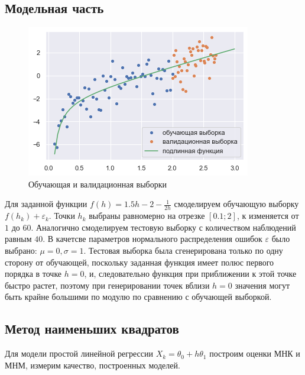 \documentclass[a4paper,12pt]{article}
\begin{document}
\subsection{Модельная часть}

\begin{figure} 
    \vspace{-4ex}
    \includegraphics[width=\linewidth]{src/img/сгенерированная_выборка.png}
    \caption{Обучающая и валидационная выборки}
\end{figure}

Для заданной функции $f(h) = 1.5h - 2 - \frac{1}{2h}$ смоделируем обучающую выборку $f(h_k) + \varepsilon_k$. Точки $h_k$ выбраны равномерно на отрезке $[0.1;2]$, $к$ изменяется от $1$ до $60$. Аналогично смоделируем тестовую выборку с количеством наблюдений равным $40$. В качетсве параметров нормального распределения ошибок $\varepsilon$ было выбрано: $\mu=0, \sigma = 1$. Тестовая выборка была сгенерирована только по одну сторону от обучающей, поскольку заданная функция имеет полюс первого порядка в точке $h = 0$, и, следовательно функция при приближении к этой точке быстро растет, поэтому при генерировании точек вблизи $h=0$ значения могут быть крайне большими по модулю по сравнению с обучающей выборкой.
\newpage

\subsection{Метод наименьших квадратов}

Для модели простой линейной регрессии $X_k = \theta_0 + h\theta_1$ построим оценки МНК и МНМ, измерим качество, построенных моделей.
\end{document}
